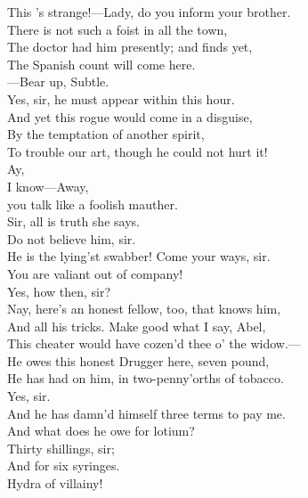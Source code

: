 \documentclass[a4paper,oneside]{memoir}
\begin{document}
\begin{drama*}
\surlyspeaks This 's strange!---Lady, do you inform your brother.\\
\facespeaks There is not such a foist in all the town,\\
The doctor had him presently; and finds yet,\\
The Spanish count will come here.\\
---Bear up, Subtle.\\
\subtlespeaks {} Yes, sir, he must appear within this hour.\\
\facespeaks And yet this rogue would come in a disguise,\\
By the temptation of another spirit,\\
To trouble our art, though he could not hurt it!\\
\kastrilspeaks Ay,\\
I know---Away,\\
you talk like a foolish mauther.\\
\surlyspeaks {} Sir, all is truth she says.\\
\facespeaks Do not believe him, sir.\\
He is the lying'st swabber! Come your ways, sir.\\
\surlyspeaks You are valiant out of company!\\
\kastrilspeaks {} Yes, how then, sir?\\
\facespeaks Nay, here's an honest fellow, too, that knows him,\\
And all his tricks. Make good what I say, Abel,\\
This cheater would have cozen'd thee o' the widow.---\\
He owes this honest Drugger here, seven pound,\\
He has had on him, in two-penny'orths of tobacco.\\
\druggerspeaks Yes, sir.\\
And he has damn'd himself three terms to pay me.\\
\facespeaks And what does he owe for lotium?\\
\druggerspeaks {} Thirty shillings, sir;\\
And for six syringes.\\
\surlyspeaks {} Hydra of villainy!\\

\end{drama*}
\end{document}
